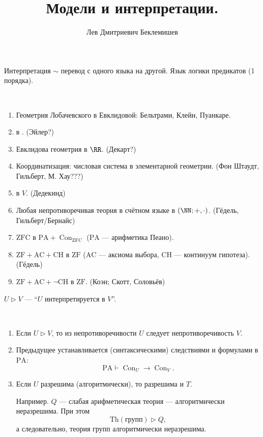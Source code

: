 \documentclass[12pt,a4paper]{article}
\title{Модели и интерпретации.}
\author{Лев Дмитриевич Беклемишев}
\newcommand{\ZF}{\mathrm{ZF}}
\newcommand{\ZFC}{\mathrm{ZFC}}
\newcommand{\PA}{\mathrm{PA}}
\newcommand{\AC}{\mathrm{AC}}
\newcommand{\CH}{\mathrm{CH}}
\newcommand{\Th}{\mathrm{Th}}
\DeclareMathOperator{\Con}{Con}
\begin{document}
    \maketitle

    Интерпретация $\sim$ перевод с одного языка на другой. Язык логики предикатов (1 порядка).
    \begin{example}\ 
        \begin{enumerate}
            \item Геометрия Лобачевского в Евклидовой: Бельтрами, Клейн, Пуанкаре.
            \item \CC в \RR. (Эйлер?)
            \item Евклидова геометрия в $\RR$. (Декарт?)
            \item Координатизация: числовая система в элементарной геометрии. (Фон Штаудт, Гильберт, М. Хау???)
            \item \RR в $V$. (Дедекинд)
            \item Любая непротиворечивая теория в счётном языке в $(\NN; {+}, {\cdot})$. (Гёдель, Гильберт/Бернайс)
            \item $\ZFC$ в $\PA + \Con_{\ZFC}$ ($\PA$ --- арифметика Пеано).
            \item $\ZF + \AC + \CH$ в $\ZF$ ($\AC$ --- аксиома выбора, $\CH$ --- континуум гипотеза). (Гёдель)
            \item $\ZF + \AC + \neg \CH$ в $\ZF$. (Коэн; Скотт, Соловьёв)
        \end{enumerate}
    \end{example}

    \begin{definition}
        $U \triangleright V$ --- ``$U$ интерпретируется в $V$''.
    \end{definition}

    \begin{lemma}\ 
        \begin{enumerate}
            \item Если $U \triangleright V$, то из непротиворечивости $U$ следует непротиворечивость $V$.
            \item Предыдущее устанавливается (синтаксическими) следствиями и формулами в $\PA$:
                \[\PA \vdash \Con_{U} \rightarrow \Con_{V}.\]
            \item Если $U$ разрешима (алгоритмически), то разрешима и $T$.

                Например. $Q$ --- слабая арифметическая теория --- алгоритмически неразрешима. При этом
                \[\Th(\text{групп}) \triangleright Q,\]
                а следовательно, теория групп алгоритмически неразрешима.
        \end{enumerate}
    \end{lemma}
\end{document}
